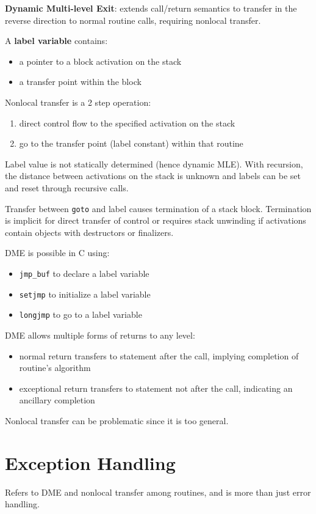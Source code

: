 \documentclass[11pt]{article}
\begin{document}
\textbf{Dynamic Multi-level Exit}: extends call/return semantics to transfer in the reverse direction to
normal routine calls, requiring nonlocal transfer.

A \textbf{label variable} contains:
\begin{itemize}
\item a pointer to a block activation on the stack
\item a transfer point within the block
\end{itemize}

Nonlocal transfer is a 2 step operation:
\begin{enumerate}
\item direct control flow to the specified activation on the stack
\item go to the transfer point (label constant) within that routine
\end{enumerate}

Label value is not statically determined (hence dynamic MLE).
With recursion, the distance between activations on the stack is unknown and labels can be set
and reset through recursive calls.

Transfer between \texttt{goto} and label causes termination of a stack block.
Termination is implicit for direct transfer of control or requires stack unwinding if activations
contain objects with destructors or finalizers.

DME is possible in C using:
\begin{itemize}
\item \texttt{jmp\_buf} to declare a label variable
\item \texttt{setjmp} to initialize a label variable
\item \texttt{longjmp} to go to a label variable
\end{itemize}

DME allows multiple forms of returns to any level:
\begin{itemize}
\item normal return transfers to statement after the call, implying completion of routine's algorithm
\item exceptional return transfers to statement not after the call, indicating an ancillary completion
\end{itemize}

Nonlocal transfer can be problematic since it is too general.
\section{Exception Handling}
\label{sec:org4edde94}
Refers to DME and nonlocal transfer among routines, and is more than just error handling.
\end{document}

